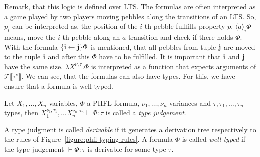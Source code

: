 Remark, that this logic is defined over LTS. The formulas are often interpreted as a game played by two players
moving pebbles along the transitions of an LTS. So, $p_i$ can be interpreted as, the position of the $i$-th pebble
fullfills property $p$. $\langle a \rangle_i \Phi$ means, move the $i$-th pebble along an $a$-transition and check if
there holds $\Phi$. With the formula $\{\emph{i}\leftarrow \emph{j}\} \Phi$ is mentioned, that all pebbles from tuple
$\emph{j}$ are moved to the tuple $\emph{i}$ and after this $\Phi$ have to be fulfilled. It is important that
$\emph{i}$ and $\emph{j}$ have the same size. $\lambda X^{\nu,\tau}.\Phi$ is interpreted as a function that expects
arguments of $\mathcal{T}\llbracket\tau^\nu\rrbracket$. We can see, that the formulas can also have types. For this,
we have ensure that a formula is well-typed.

\begin{definition}
    Let $X_1, \dots, X_n$ variables, $\Phi$ a PHFL formula, $\nu_1, \dots, \nu_n$ variances and $\tau, \tau_1, \dots,
    \tau_n$ types, then $X_1^{\nu_1, \tau_1}, \dots X_n^{\nu_n, \tau_n} \vdash \Phi:\tau$ is called a \emph{type
    judgement}.
\end{definition}

A type judgment is called \textit{derivable} if it generates a derivation tree respectively to the rules of
Figure~\ref{figure:phfl-typing-rules}. A formula $\Phi$ is called \textit{well-typed} if the type judgement $\vdash
\Phi:\tau$ is derivable for some type $\tau$.


